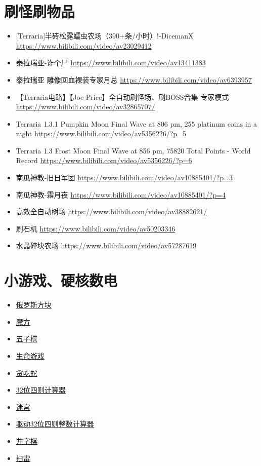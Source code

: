 \section{刷怪刷物品}
\begin{itemize}
\item {[}Terraria]半砖松露蠕虫农场（390+条/小时）!-DicemanX \url{https://www.bilibili.com/video/av23029412}
\item 泰拉瑞亚-诈个尸 \url{https://www.bilibili.com/video/av13411383}
\item 泰拉瑞亚 雕像回血裸装专家月总 \url{https://www.bilibili.com/video/av6393957}
\item 【Terraria电路】【Joe Price】全自动刷怪场、刷BOSS合集 专家模式 \url{https://www.bilibili.com/video/av32865707/}
\item Terraria 1.3.1 Pumpkin Moon Final Wave at 806 pm, 255 platinum coins in a night \url{https://www.bilibili.com/video/av5356226/?p=5}
\item Terraria 1.3 Frost Moon Final Wave at 856 pm, 75820 Total Points - World Record \url{https://www.bilibili.com/video/av5356226/?p=6}

\item 南瓜神教-旧日军团 \url{https://www.bilibili.com/video/av10885401/?p=3}
\item 南瓜神教-霜月夜 \url{https://www.bilibili.com/video/av10885401/?p=4}
\item 高效全自动树场 \url{https://www.bilibili.com/video/av38882621/}
\item 刷石机 \url{https://www.bilibili.com/video/av50203346}
\item 水晶碎块农场 \url{https://www.bilibili.com/video/av57287619}
\end{itemize}

\section{小游戏、硬核数电}
\begin{itemize}
\item \href{https://www.bilibili.com/video/av38924330}{俄罗斯方块}
\item \href{https://www.bilibili.com/video/av56760618}{魔方}
\item \href{https://www.bilibili.com/video/av93790872}{五子棋}
\item \href{https://www.bilibili.com/video/BV1RP4y1x7qC}{生命游戏}
\item \href{https://www.bilibili.com/video/BV1xK4y1N7DL}{贪吃蛇}
\item \href{https://www.bilibili.com/video/BV1XA411b7aj}{32位四则计算器}
\item \href{https://www.bilibili.com/video/BV1sk4y1m7DE}{迷宫}
\item \href{https://www.bilibili.com/video/BV1fv411v7rp}{驱动32位四则整数计算器}
\item \href{https://www.bilibili.com/video/BV155411P7AQ}{井字棋}
\item \href{https://www.bilibili.com/video/BV17v4y197vk}{扫雷}
\end{itemize}

